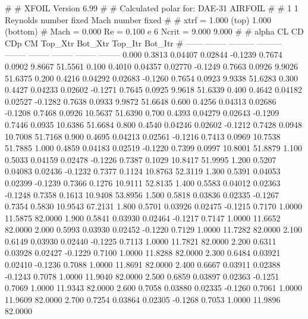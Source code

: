 #  
#       XFOIL         Version 6.99
#  
# Calculated polar for: DAE-31 AIRFOIL                                  
#  
# 1 1 Reynolds number fixed          Mach number fixed         
#  
# xtrf =   1.000 (top)        1.000 (bottom)  
# Mach =   0.000     Re =     0.100 e 6     Ncrit =   9.000  9.000
#  
#   alpha    CL        CD       CDp       CM     Top_Xtr  Bot_Xtr  Top_Itr  Bot_Itr
#  ------ -------- --------- --------- -------- -------- -------- -------- --------
   0.000   0.3813   0.04407   0.02844  -0.1239   0.7674   0.0902   9.8667  51.5561
   0.100   0.4010   0.04357   0.02770  -0.1249   0.7663   0.0926   9.9026  51.6375
   0.200   0.4216   0.04292   0.02683  -0.1260   0.7654   0.0923   9.9338  51.6283
   0.300   0.4427   0.04233   0.02602  -0.1271   0.7645   0.0925   9.9618  51.6339
   0.400   0.4642   0.04182   0.02527  -0.1282   0.7638   0.0933   9.9872  51.6648
   0.600   0.4256   0.04313   0.02686  -0.1208   0.7468   0.0926  10.5637  51.6390
   0.700   0.4393   0.04279   0.02643  -0.1209   0.7446   0.0935  10.6386  51.6684
   0.800   0.4540   0.04246   0.02602  -0.1212   0.7428   0.0948  10.7008  51.7168
   0.900   0.4695   0.04213   0.02561  -0.1216   0.7413   0.0969  10.7538  51.7885
   1.000   0.4859   0.04183   0.02519  -0.1220   0.7399   0.0997  10.8001  51.8879
   1.100   0.5033   0.04159   0.02478  -0.1226   0.7387   0.1029  10.8417  51.9995
   1.200   0.5207   0.04083   0.02436  -0.1232   0.7377   0.1124  10.8763  52.3119
   1.300   0.5391   0.04053   0.02399  -0.1239   0.7366   0.1276  10.9111  52.8135
   1.400   0.5583   0.04012   0.02363  -0.1248   0.7358   0.1613  10.9408  53.8956
   1.500   0.5818   0.03836   0.02335  -0.1267   0.7354   0.5830  10.9543  67.2131
   1.800   0.5701   0.03926   0.02475  -0.1215   0.7170   1.0000  11.5875  82.0000
   1.900   0.5841   0.03930   0.02464  -0.1217   0.7147   1.0000  11.6652  82.0000
   2.000   0.5993   0.03930   0.02452  -0.1220   0.7129   1.0000  11.7282  82.0000
   2.100   0.6149   0.03930   0.02440  -0.1225   0.7113   1.0000  11.7821  82.0000
   2.200   0.6311   0.03928   0.02427  -0.1229   0.7100   1.0000  11.8288  82.0000
   2.300   0.6484   0.03921   0.02410  -0.1236   0.7088   1.0000  11.8691  82.0000
   2.400   0.6667   0.03911   0.02388  -0.1243   0.7078   1.0000  11.9040  82.0000
   2.500   0.6859   0.03897   0.02363  -0.1251   0.7069   1.0000  11.9343  82.0000
   2.600   0.7058   0.03880   0.02335  -0.1260   0.7061   1.0000  11.9609  82.0000
   2.700   0.7254   0.03864   0.02305  -0.1268   0.7053   1.0000  11.9896  82.0000

